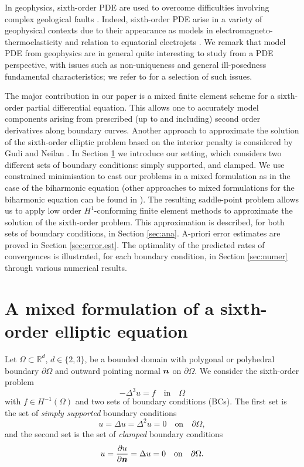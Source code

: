 \documentclass[a4paper,final]{siamltex}
\newcommand{\bn}{\mbox{\boldmath{$n$}}}
\newcommand{\BBR}{\mbox{$\mathbb{R}$}}
\begin{document}
In geophysics, sixth-order PDE are used to overcome difficulties involving
complex geological faults \cite{yao2015smooth}.
Indeed, sixth-order PDE arise in a variety of geophysical contexts due to their
appearance as models in electromagneto-thermoelasticity \cite{sherief2002two}
and relation to equatorial electrojets \cite{whitehead1971equatorial}.
We remark that model PDE from geophysics are in general quite interesting to
study from a PDE perspective, with issues such as non-uniqueness and general
ill-posedness fundamental characteristics; we refer to \cite{EAA1973} for a
selection of such issues. 

The major contribution in our paper is a mixed finite element scheme for a
sixth-order partial differential equation. This allows one to accurately model
components arising from prescribed (up to and including) second order
derivatives along boundary curves.  {Another approach to approximate 
the solution of the sixth-order elliptic problem based on the interior penalty is considered by Gudi and Neilan \cite{GN11}.}
In Section \ref{SCTformulation} we introduce our setting, which considers two different
sets of boundary conditions: simply supported, and clamped.
We use constrained minimisation to cast our problems in a mixed formulation as
in the case of the biharmonic equation \cite{Cia78,DP01,Lam11a}
(other approaches to mixed formulations for the biharmonic equation can be found in
\cite{CR74,CG75,Fal78,FO80,BOP80,Mon87,Lam11b}).
The resulting saddle-point problem allows us to apply low order $H^1$-conforming finite element methods 
to approximate the solution of the sixth-order problem. This approximation is
described, for both sets of boundary conditions, in Section \ref{sec:ana}. A-priori
error estimates are proved in Section \ref{sec:error.est}.
The optimality of the predicted rates of convergences is illustrated, for each
boundary condition, in Section \ref{sec:numer} through various numerical
results. 

\section{A mixed formulation of a sixth-order elliptic equation}%
\label{SCTformulation}

Let $\Omega \subset \BBR^d$, $d\in \{2,3\}$, be a bounded
domain  with polygonal or polyhedral boundary $\partial\Omega$ and 
outward pointing normal $\bn$ on  $\partial\Omega$.
We consider the sixth-order problem 
\begin{equation}\label{biharm}
-\Delta^3 u =f \quad\text{in}\quad \Omega
\end{equation}
with $f\in H^{-1}(\Omega)$  and two sets of boundary conditions (BCs). 
The first set is the set of \emph{simply supported} boundary conditions 
\begin{equation}\label{sabc}
u =\Delta u=\Delta^2 u=0\quad\text{on}\quad \partial\Omega,
\end{equation}
and the second set is the set of \emph{clamped} boundary conditions
\begin{equation}\label{clabc}
u =\frac{\partial u}{\partial \bn}=\Delta u=0\quad\text{on}\quad \partial\Omega.
\end{equation}
\end{document}
